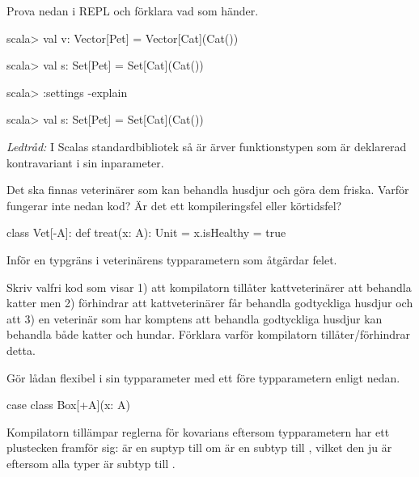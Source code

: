 \Subtask Prova nedan i REPL och förklara vad som händer.      
\begin{REPLnonum}
scala> val v: Vector[Pet] = Vector[Cat](Cat())

scala> val s: Set[Pet] = Set[Cat](Cat())

scala> :settings -explain

scala> val s: Set[Pet] = Set[Cat](Cat())
\end{REPLnonum} 
\emph{Ledtråd:} I Scalas standardbibliotek så är ärver  funktionstypen  som är deklarerad kontravariant i sin inparameter.

\Subtask Det ska finnas veterinärer som kan behandla husdjur och göra dem friska. Varför fungerar inte nedan kod? Är det ett kompileringsfel eller körtidsfel?

\begin{Code}
class Vet[-A]:
  def treat(x: A): Unit = x.isHealthy = true
\end{Code}

\Subtask Inför en typgräns i veterinärens typparametern som åtgärdar felet.

\Subtask Skriv valfri kod som visar 1) att kompilatorn tillåter kattveterinärer att behandla katter men 2) förhindrar att kattveterinärer får behandla godtyckliga husdjur och att 3) en veterinär som har komptens att behandla godtyckliga husdjur kan behandla både katter och hundar. Förklara varför kompilatorn tillåter/förhindrar detta.

\SOLUTION


\TaskSolved \what

\SubtaskSolved Gör lådan flexibel i sin typparameter med ett \code{+} före typparametern enligt nedan. 
\begin{Code}
case class Box[+A](x: A)
\end{Code}
Kompilatorn tillämpar reglerna för kovarians eftersom typparametern har ett plustecken framför sig:  är en suptyp till  om  är en subtyp till , vilket den ju är eftersom alla typer är subtyp till . 

